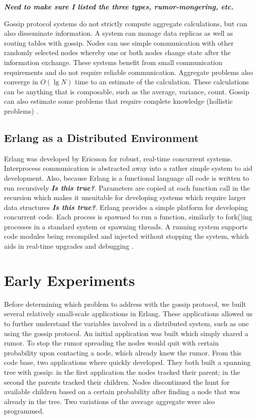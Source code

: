 \documentclass[11pt,twocolumn]{article}
\begin{document}
{\bf {\em Need to make sure I listed the three types, rumor-mongering, etc.}}

Gossip protocol systems do not strictly compute aggregate calculations, but can also disseminate information.  A system can manage data replicas as well as routing tables with gossip.  Nodes can use simple communication with other randomly selected nodes whereby one or both nodes change state after the information exchange.  These systems benefit from small communication requirements and do not require reliable communication.  Aggregate problems also converge in $O(\lg N)$ time to an estimate of the calculation.  These calculations can be anything that is composable, such as the average, variance, count.  Gossip can also estimate some problems that require complete knowledge (hollistic problems) \cite{Birm2007}.

\subsection{Erlang as a Distributed Environment}

Erlang was developed by Ericsson for robust, real-time concurrent systems.  Interprocess communication is abstracted away into a rather simple system to aid development.  Also, because Erlang is a functional language all code is written to run recursively {\bf {\em Is this true?}}.  Parameters are copied at each function call in the recursion which makes it unsuitable for developing systems which require larger data structures {\bf {\em Is this true?}}.  Erlang provides a simple platform for developing concurrent code.  Each process is spawned to run a function, similarly to fork()ing processes in a standard system or spawning threads.  A running system supports code modules being recompiled and injected without stopping the system, which aids in real-time upgrades and debugging \cite{Erlang}.

\section{Early Experiments}

Before determining which problem to address with the gossip protocol, we built several relatively small-scale applications in Erlang.  These applications allowed us to further understand the variables involved in a distributed system, such as one using the gossip protocol.  An initial application was built which simply shared a rumor.  To stop the rumor spreading the nodes would quit with certain probability upon contacting a node, which already knew the rumor.  From this code base, two applications where quickly developed.  They both built a spanning tree with gossip: in the first application the nodes tracked their parent; in the second the parents tracked their children.  Nodes discontinued the hunt for available children based on a certain probability after finding a node that was already in the tree.  Two variations of the average aggregate were also programmed.
\end{document}
